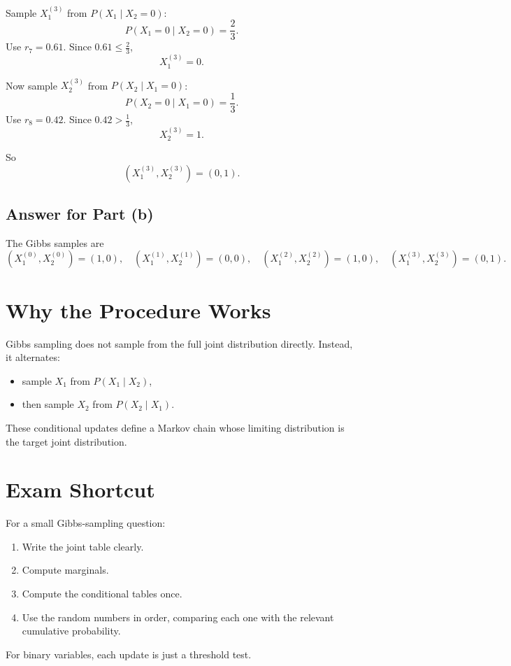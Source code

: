 \documentclass[11pt]{article}
\begin{document}
Sample \(X_1^{(3)}\) from \(P(X_1\mid X_2=0)\):
\[
    P(X_1=0\mid X_2=0)=\frac23.
\]
Use \(r_7=0.61\). Since \(0.61\le \frac23\),
\[
    X_1^{(3)}=0.
\]

Now sample \(X_2^{(3)}\) from \(P(X_2\mid X_1=0)\):
\[
    P(X_2=0\mid X_1=0)=\frac13.
\]
Use \(r_8=0.42\). Since \(0.42>\frac13\),
\[
    X_2^{(3)}=1.
\]

So
\[
    (X_1^{(3)},X_2^{(3)})=(0,1).
\]

\subsection*{Answer for Part (b)}

The Gibbs samples are
\[
    \boxed{
    (X_1^{(0)},X_2^{(0)})=(1,0),\quad
    (X_1^{(1)},X_2^{(1)})=(0,0),\quad
    (X_1^{(2)},X_2^{(2)})=(1,0),\quad
    (X_1^{(3)},X_2^{(3)})=(0,1).
    }
\]

\section*{Why the Procedure Works}

Gibbs sampling does not sample from the full joint distribution directly. Instead,
it alternates:
\begin{itemize}
    \item sample \(X_1\) from \(P(X_1\mid X_2)\),
    \item then sample \(X_2\) from \(P(X_2\mid X_1)\).
\end{itemize}

These conditional updates define a Markov chain whose limiting distribution is
the target joint distribution.

\section*{Exam Shortcut}

For a small Gibbs-sampling question:
\begin{enumerate}[label=\arabic*.]
    \item Write the joint table clearly.
    \item Compute marginals.
    \item Compute the conditional tables once.
    \item Use the random numbers in order, comparing each one with the relevant
    cumulative probability.
\end{enumerate}

For binary variables, each update is just a threshold test.
\end{document}
